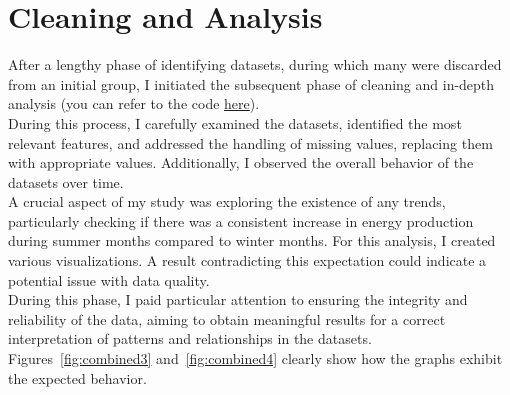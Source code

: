\documentclass[12pt]{article}
\begin{document}
  \section{Cleaning and Analysis}
  After a lengthy phase of identifying datasets, during which many were discarded from an initial group, I initiated the subsequent phase of cleaning and in-depth analysis (you can refer to the code \href{https://www.kaggle.com/code/alessandromajumba/small-project-in-ai}{here}).
  \\
  During this process, I carefully examined the datasets, identified the most relevant features, and addressed the handling of missing values, replacing them with appropriate values. Additionally, I observed the overall behavior of the datasets over time.
  \\
  A crucial aspect of my study was exploring the existence of any trends, particularly checking if there was a consistent increase in energy production during summer months compared to winter months. For this analysis, I created various visualizations. A result contradicting this expectation could indicate a potential issue with data quality.
  \\
  During this phase, I paid particular attention to ensuring the integrity and reliability of the data, aiming to obtain meaningful results for a correct interpretation of patterns and relationships in the datasets.
  \\
  Figures~\ref{fig:combined3} and~\ref{fig:combined4} clearly show how the graphs exhibit the expected behavior.
\end{document}
